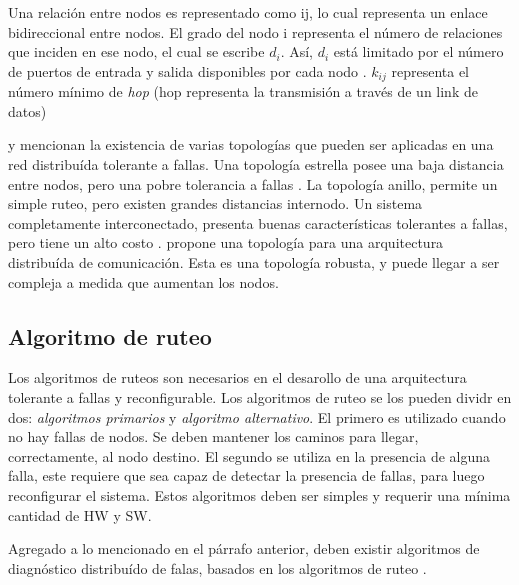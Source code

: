 Una relación entre nodos es representado  como ij, lo cual representa un enlace bidireccional entre nodos. El grado del nodo i representa el número de relaciones que inciden en ese nodo, el cual se escribe $d_i$. Así, $d_i$ está limitado por el número de puertos de entrada y salida disponibles por cada nodo \citep{Pradhan82}. $k_{ij}$ representa el número mínimo de \textit{hop} (hop representa la transmisión a través de un link de datos)\citep{Pradhan82}

\cite{Stivaros92} y \cite{Pradhan82} mencionan la existencia de varias topologías que pueden ser aplicadas en una red distribuída tolerante a fallas. Una topología estrella posee una baja distancia entre nodos, pero una pobre tolerancia a fallas \citep{Pradhan82} \citep{Stivaros92}. La topología anillo, permite un simple ruteo, pero existen grandes distancias internodo. Un sistema completamente interconectado, presenta buenas características tolerantes a fallas, pero tiene un alto costo \citep{Pradhan82}. \cite{Pradhan82} propone una topología para una arquitectura distribuída de comunicación. Esta es una topología robusta, y puede llegar a ser compleja a medida que aumentan los nodos.

\subsection{Algoritmo de ruteo}
Los algoritmos de ruteos son necesarios en el desarollo de una arquitectura tolerante a fallas y reconfigurable. Los algoritmos de ruteo se los pueden dividr en dos: \textit{algoritmos primarios} y \textit{algoritmo alternativo}. El primero es utilizado cuando no hay fallas de nodos. Se deben mantener los caminos para llegar, correctamente, al nodo destino. El segundo se utiliza en la presencia de alguna falla, este requiere que sea capaz de detectar la presencia de fallas, para luego reconfigurar el sistema. Estos algoritmos deben ser simples y requerir una mínima cantidad de \ac{HW} y \ac{SW}.

Agregado a lo mencionado en el párrafo anterior, deben existir algoritmos de diagnóstico distribuído de falas, basados en los algoritmos de ruteo \citep{Pradhan82}.
